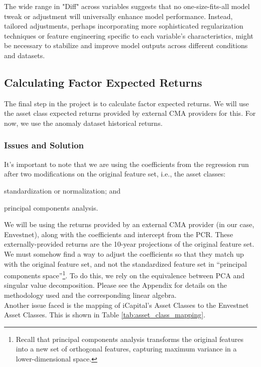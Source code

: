 \documentclass{ledger}
\begin{document}
The wide range in "Diff" across variables suggests that no one-size-fits-all model tweak or adjustment will universally enhance model performance. Instead, tailored adjustments, perhaps incorporating more sophisticated regularization techniques or feature engineering specific to each variable's characteristics, might be necessary to stabilize and improve model outputs across different conditions and datasets. \\

\subsection{Calculating Factor Expected Returns}
The final step in the project is to calculate factor expected returns. We will use the asset class expected returns provided by external CMA providers for this. For now, we use the anomaly dataset historical returns. \\

\subsubsection{Issues and Solution} 
It's important to note that we are using the coefficients from the regression run after two modifications on the original feature set, i.e., the asset classes: \begin{inparaenum}[(i)] \item standardization or normalization; and \item principal components analysis.\end{inparaenum}We will be using the returns provided by an external CMA provider (in our case, Envestnet), along with the coefficients and intercept from the PCR. These externally-provided returns are the 10-year projections of the original feature set. We must somehow find a way to adjust the coefficients so that they match up with the original feature set, and not the standardized feature set in ``principal components space''\footnote{Recall that principal components analysis transforms the original features into a new set of orthogonal features, capturing maximum variance in a lower-dimensional space.}. To do this, we rely on the equivalence between PCA and singular value decomposition. Please see the Appendix for details on the methodology used and the corresponding linear algebra. \\

Another issue faced is the mapping of iCapital's Asset Classes to the Envestnet Asset Classes. This is shown in Table \ref{tab:asset_class_mapping}. \\
\end{document}
